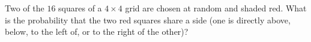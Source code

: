 Two of the $16$ squares of a $4\times4$ grid are chosen at random and shaded red. What is the probability that the two red squares share a side (one is directly above, below, to the left of, or to the right of the other)?
